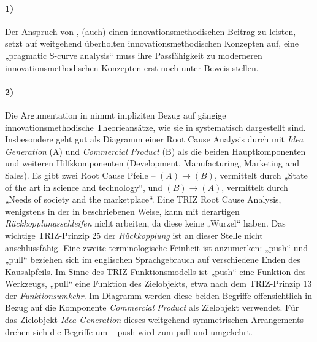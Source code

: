 \documentclass[11pt,a4paper]{article}
\begin{document}
\paragraph{1)}
Der Anspruch von \cite{TESE2018}, (auch) einen innovationsmethodischen Beitrag
zu leisten, setzt auf weitgehend überholten innovationsmethodischen Konzepten
auf, eine „pragmatic S-curve analysis“ muss ihre Passfähigkeit zu moderneren
innovationsmethodischen Konzepten erst noch unter Beweis stellen.

\paragraph{2)}
Die Argumentation in \cite{TESE2018} nimmt impliziten Bezug auf gängige
innovationsmethodische Theorieansätze, wie sie in \cite{Preez2006}
systematisch dargestellt sind.  Insbesondere \cite[Fig. 3]{Preez2006} geht gut
als Diagramm einer Root Cause Analysis durch mit \emph{Idea Generation} (A)
und \emph{Commercial Product} (B) als die beiden Hauptkomponenten und weiteren
Hilfskomponenten (Development, Manufacturing, Marketing and Sales).  Es gibt
zwei Root Cause Pfeile -- $(A) \longrightarrow (B)$, vermittelt durch „State
of the art in science and technology“, und $(B) \longrightarrow (A)$,
vermittelt durch „Needs of society and the marketplace“. Eine TRIZ Root Cause
Analysis, wenigstens in der in \cite[Kap. 4.7]{KS2017} beschriebenen Weise,
kann mit derartigen \emph{Rückkopplungsschleifen} nicht arbeiten, da diese
keine „Wurzel“ haben. Das wichtige TRIZ-Prinzip 25 der \emph{Rückkopplung} ist
an dieser Stelle nicht anschlussfähig.  Eine zweite terminologische Feinheit
ist anzumerken: „push“ und „pull“ beziehen sich im englischen Sprachgebrauch
auf verschiedene Enden des Kausalpfeils. Im Sinne des TRIZ-Funktionsmodells
\cite[Kap. 4.4]{KS2017} ist „push“ eine Funktion des Werkzeugs, „pull“ eine
Funktion des Zielobjekts, etwa nach dem TRIZ-Prinzip 13 der
\emph{Funktionsumkehr}.  Im Diagramm \cite[Fig. 3]{Preez2006} werden diese
beiden Begriffe offensichtlich in Bezug auf die Komponente \emph{Commercial
  Product} als Zielobjekt verwendet.  Für das Zielobjekt \emph{Idea
  Generation} dieses weitgehend symmetrischen Arrangements drehen sich die
Begriffe um -- push wird zum pull und umgekehrt.
\end{document}
